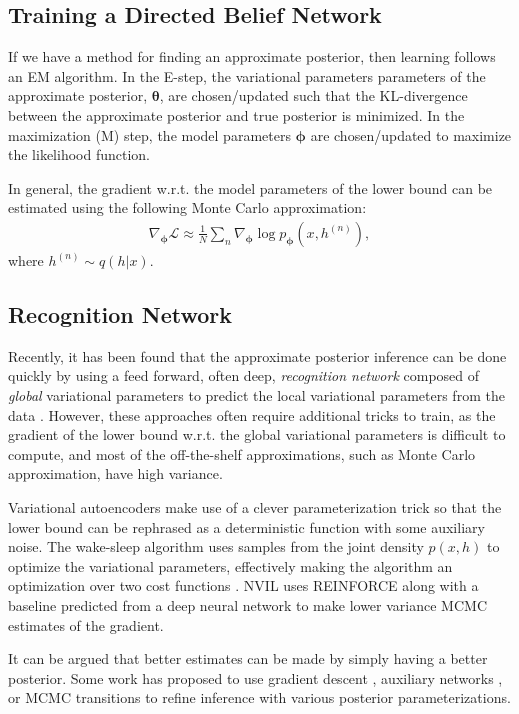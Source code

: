 \documentclass{article} %
\newcommand{\vects}[1]{\boldsymbol{#1}}
\newcommand{\TT}[0]{\vects{\theta}}
\newcommand{\PP}[0]{\vects{\phi}}
\newcommand{\LL}[0]{\mathcal{L}}
\begin{document}
\subsection{Training a Directed Belief Network}

If we have a method for finding an approximate posterior, then learning follows an
EM algorithm.  In the E-step, the variational parameters parameters of the approximate posterior, $\TT$,
are chosen/updated such that the KL-divergence between the approximate posterior and
true posterior is minimized. In the maximization (M) step, the model parameters
$\PP$ are chosen/updated to maximize the likelihood function.

In general, the gradient w.r.t. the model parameters of the lower bound can be
estimated using the following Monte Carlo approximation:
\begin{align}
\nabla_{\PP} \LL \approx \frac{1}{N} \sum_n \nabla_{\PP} \log p_{\PP}(x, h^{(n)}),
\end{align}
where $h^{(n)} \sim q(h|x)$.

\subsection{Recognition Network}

Recently, it has been found that the approximate posterior inference can be done
quickly by using a feed forward, often deep, \emph{recognition network} composed
of \emph{global} variational parameters to predict the local variational
parameters from the data \citep[see,
e.g.,][]{kingma2013auto,mnih2014neural,rezende2014stochastic}. However, these
approaches often require additional tricks to train, as the gradient of the
lower bound w.r.t. the global variational parameters is difficult to compute,
and most of the off-the-shelf approximations, such as Monte Carlo approximation,
have high variance. 

Variational autoencoders \citep[VAE,][]{kingma2013auto} make use of a clever
parameterization trick so that the lower bound can be rephrased as a
deterministic function with some auxiliary noise. The wake-sleep algorithm uses
samples from the joint density $p(x, h)$ to optimize the variational parameters,
effectively making the algorithm an optimization over two cost functions
\citep{hinton1995wake}. NVIL
uses REINFORCE \citep{williams1992simple} along with a baseline predicted from a deep neural network to
make lower variance MCMC estimates of the gradient.

It can be argued that better estimates can be made by simply having a better
posterior. Some work has proposed to use gradient descent
\citep{hoffman2013stochastic}, auxiliary networks
\citep{rezende2015variational}, or MCMC transitions \citep{salimans2014markov}
to refine inference with various posterior parameterizations. 
\end{document}
